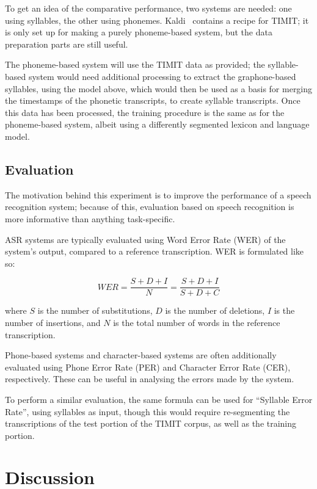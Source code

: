 \documentclass{article}[11pt]
\begin{document}
To get an idea of the comparative performance, two systems are needed: one using syllables, the other using phonemes. Kaldi~\citep{povey_kaldi_2011} contains a recipe for TIMIT; it is only set up for making a purely phoneme-based system, but the data preparation parts are still useful.

The phoneme-based system will use the TIMIT data as provided; the syllable-based system would need additional processing to extract the graphone-based syllables, using the model above, which would then be used as a basis for merging the timestamps of the phonetic transcripts, to create syllable transcripts. Once this data has been processed, the training procedure is the same as for the phoneme-based system, albeit using a differently segmented lexicon and language model.

\subsection{Evaluation}
\label{ssect:eval}

The motivation behind this experiment is to improve the performance of a speech recognition system; because of this, evaluation based on speech recognition is more informative than anything task-specific.

ASR systems are typically evaluated using Word Error Rate (WER) of the system's output, compared to a reference transcription. WER is formulated like so:

\[ \mathit{WER} = \frac{S+D+I}{N} = \frac{S+D+I}{S+D+C} \]

where $S$ is the number of substitutions, $D$ is the number of deletions, $I$ is the number of insertions, and $N$ is the total number of words in the reference transcription. 

Phone-based systems and character-based systems are often additionally evaluated using Phone Error Rate (PER) and Character Error Rate (CER), respectively. These can be useful in analysing the errors made by the system.

To perform a similar evaluation, the same formula can be used for ``Syllable Error Rate'', using syllables as input, though this would require re-segmenting the transcriptions of the test portion of the TIMIT corpus, as well as the training portion.

\section{Discussion}
\label{sect:discussion}
\end{document}
